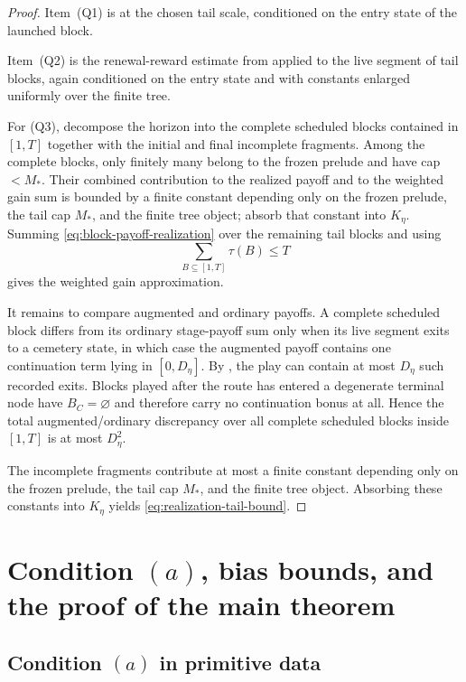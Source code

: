 \documentclass[12pt]{article}
\theoremstyle{definition}
\newcommand{\1}{\mathbf{1}}
\begin{document}
\begin{proof}
Item~(Q1) is  at the chosen tail scale, conditioned on
the entry state of the launched block.

Item~(Q2) is the renewal-reward estimate from 
applied to the live segment of tail blocks, again conditioned on the entry state
and with constants enlarged uniformly over the finite tree.

For (Q3), decompose the horizon into the complete scheduled blocks contained in
$[1,T]$ together with the initial and final incomplete fragments. Among the
complete blocks, only finitely many belong to the frozen prelude and have cap
$<M_*$. Their combined contribution to the realized payoff and to the weighted
gain sum is bounded by a finite constant depending only on the frozen prelude,
the tail cap $M_*$, and the finite tree object; absorb that constant into
$K_\eta$. Summing \eqref{eq:block-payoff-realization} over the remaining tail
blocks and using
\[
\sum_{B\subseteq [1,T]} \tau(B)\le T
\]
gives the weighted gain approximation.

It remains to compare augmented and ordinary payoffs. A complete scheduled block
differs from its ordinary stage-payoff sum only when its live segment exits to a
cemetery state, in which case the augmented payoff contains one continuation term
lying in $[0,D_\eta]$. By , the play can contain at
most $D_\eta$ such recorded exits. Blocks played after the route has entered a
degenerate terminal node have $B_C=\varnothing$ and therefore carry no
continuation bonus at all. Hence the total augmented/ordinary discrepancy over
all complete scheduled blocks inside $[1,T]$ is at most $D_\eta^2$.

The incomplete fragments contribute at most a finite constant depending only on
the frozen prelude, the tail cap $M_*$, and the finite tree object. Absorbing
these constants into $K_\eta$ yields \eqref{eq:realization-tail-bound}.
\end{proof}

\section{Condition \texorpdfstring{$(a)$}{(a)}, bias bounds, and the proof of the main theorem}
\label{sec:proof-main}

\subsection{Condition \texorpdfstring{$(a)$}{(a)} in primitive data}
\end{document}
